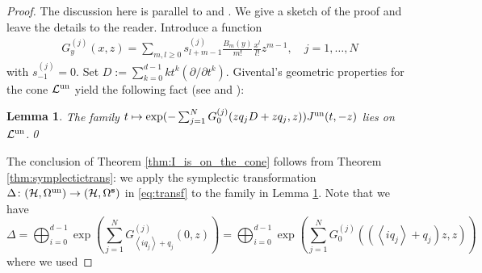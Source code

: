 \documentclass[11pt]{amsart}
\newtheorem{lem}[thm]{Lemma} %
\theoremstyle{definition} %
\theoremstyle{remark} %
\newcommand{\un}{{\rm un}}
\def\fracp#1{\left\langle #1 \right\rangle}
\newcommand{\bs}{\mathbf{s}}
\newcommand{\bk}{\mathbf{k}}
\newcommand{\cL}{\mathcal{L}}
\newcommand{\cH}{\mathcal{H}}
\begin{document}
\begin{proof} 
The discussion here is parallel to 
\cite[Theorem 4.8]{CCIT:computing} 
and \cite[Theorem 4.1.6]{ChiRquintic}. 
We give a sketch of the proof 
and leave the details to the reader. 
Introduce a function 
\begin{eqnarray*}
G^{(j)}_y(x,z)=\sum_{m,l\ge 0}
s^{(j)}_{l+m-1}\frac{B_m(y)}{m!}\frac{x^l}{l!}z^{m-1}, \quad 
j=1,\dots, N 
\end{eqnarray*}
with $s^{(j)}_{-1}=0$.
Set $D := \sum_{k=0}^{d-1} k t^k (\partial/\partial t^k)$. 
Givental's geometric properties for the cone $\cL^\un$ 
yield the following fact (see 
\cite[Eqn (14)]{CCIT:computing} and 
\cite[Lemma 4.1.10]{ChiRquintic}): 
\begin{lem} 
\label{lem:diffop-applied} 
The family $t\mapsto \exp(-\sum_{j=1}^N 
G_{0}^{(j)}(zq_j D+zq_j,z))J^\un(t,-z)$ lies on $\cL^{\un}$.\qed
\end{lem}
The conclusion of Theorem \ref{thm:I_is_on_the_cone} follows from 
Theorem \ref{thm:symplectictrans}: we apply the symplectic 
transformation $\Delta \colon (\cH,\Omega^\un) \to (\cH,\Omega^\bs)$ 
in \eqref{eq:transf} to the family in Lemma \ref{lem:diffop-applied}. 
Note that we have 
\[
\Delta = \bigoplus_{i=0}^{d-1} 
\exp \left( \sum_{j=1}^N G_{\fracp{iq_j}+q_j}^{(j)}(0,z) 
\right) 
= \bigoplus_{i=0}^{d-1} 
\exp \left( \sum_{j=1}^N G_0^{(j)}\left( (\fracp{iq_j} +q_j)z, z 
\right) \right) 
\]
where we used 

\end{proof}
\end{document}
